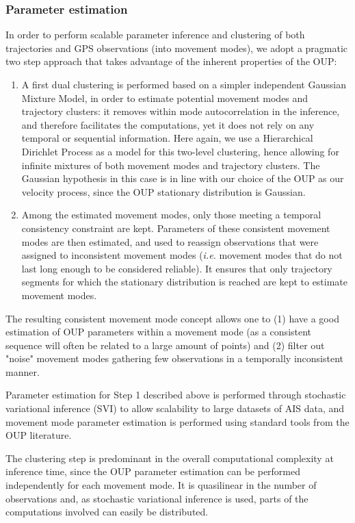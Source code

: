 \subsubsection{Parameter estimation}

In order to perform scalable parameter inference and clustering of both
trajectories and GPS observations (into movement modes), we adopt a pragmatic
two step approach that takes advantage of the inherent properties of the OUP:

\begin{enumerate}
\item A first dual clustering is performed based on a simpler independent
Gaussian Mixture Model, in order to estimate potential movement modes and
trajectory clusters: it removes within mode autocorrelation in
the inference, and therefore facilitates the computations, yet it does not rely
on any temporal or sequential information.
Here again, we use a Hierarchical Dirichlet Process as a model for this
two-level clustering, hence allowing for infinite mixtures of both movement
modes and trajectory clusters.
The Gaussian hypothesis in this case is in line with our choice of the OUP as
our velocity process, since the OUP stationary distribution is Gaussian.
\item Among the estimated movement modes, only those meeting a temporal consistency
constraint are kept.
Parameters of these consistent movement modes are then estimated, and used to
reassign observations that were assigned to inconsistent movement modes (\emph{i.e.}
movement modes that do not last long enough to be considered reliable).
It ensures that only trajectory segments for which the stationary distribution
is reached are kept to estimate movement modes.
\end{enumerate}

The resulting consistent movement mode concept allows one to (1) have a good
estimation of OUP parameters within a movement mode (as a consistent sequence
will often be related to a large amount of points) and (2) filter out
"noise" movement modes gathering few observations in a temporally
inconsistent manner.

Parameter estimation for Step 1 described above is performed through stochastic
variational inference (SVI) to allow scalability to large datasets of AIS data,
and movement mode parameter estimation is performed using standard tools from
the OUP literature.

The clustering
step is predominant in the overall computational complexity at inference time,
since the OUP parameter estimation can be performed independently for each
movement mode.
It is quasilinear in the number of
observations and, as stochastic variational inference is used, parts of the
computations involved can easily be distributed.

